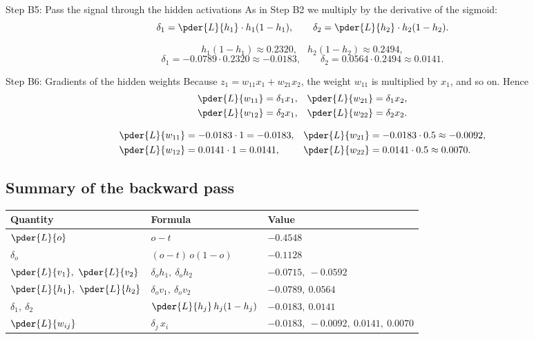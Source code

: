 \begin{stepbox}{Step B5: Pass the signal through the hidden activations}
As in Step B2 we multiply by the derivative of the sigmoid:
\[
\delta_1=\pder{L}{h_1}\cdot h_1(1-h_1),\qquad
\delta_2=\pder{L}{h_2}\cdot h_2(1-h_2).
\]
\end{stepbox}
\[
h_1(1-h_1)\approx0.2320,\quad h_2(1-h_2)\approx0.2494,
\]
\[
\delta_1=-0.0789\cdot0.2320\approx-0.0183,\qquad
\delta_2=0.0564\cdot0.2494\approx0.0141.
\]

\begin{stepbox}{Step B6: Gradients of the hidden weights}
Because $z_1=w_{11}x_1+w_{21}x_2$, the weight $w_{11}$ is multiplied by $x_1$, and so on. Hence
\begin{align*}
\pder{L}{w_{11}}&=\delta_1x_1, & \pder{L}{w_{21}}&=\delta_1x_2,\\
\pder{L}{w_{12}}&=\delta_2x_1, & \pder{L}{w_{22}}&=\delta_2x_2.
\end{align*}
\end{stepbox}
\begin{align*}
\pder{L}{w_{11}}&=-0.0183\cdot1=-0.0183, & \pder{L}{w_{21}}&=-0.0183\cdot0.5\approx-0.0092,\\
\pder{L}{w_{12}}&=0.0141\cdot1=0.0141, & \pder{L}{w_{22}}&=0.0141\cdot0.5\approx0.0070.
\end{align*}

\subsection*{Summary of the backward pass}
\begin{center}
\renewcommand{\arraystretch}{1.7}
\begin{tabular}{lll}
\textbf{Quantity} & \textbf{Formula} & \textbf{Value}\\\hline
$\pder{L}{o}$ & $o-t$ & $-0.4548$\\
$\delta_o$ & $(o-t)\,o(1-o)$ & $-0.1128$\\
$\pder{L}{v_1},\ \pder{L}{v_2}$ & $\delta_o h_1,\ \delta_o h_2$ & $-0.0715,\ -0.0592$\\
$\pder{L}{h_1},\ \pder{L}{h_2}$ & $\delta_o v_1,\ \delta_o v_2$ & $-0.0789,\ 0.0564$\\
$\delta_1,\ \delta_2$ & $\pder{L}{h_j}\,h_j(1-h_j)$ & $-0.0183,\ 0.0141$\\
$\pder{L}{w_{ij}}$ & $\delta_j\,x_i$ & $-0.0183,\ -0.0092,\ 0.0141,\ 0.0070$
\end{tabular}
\end{center}

